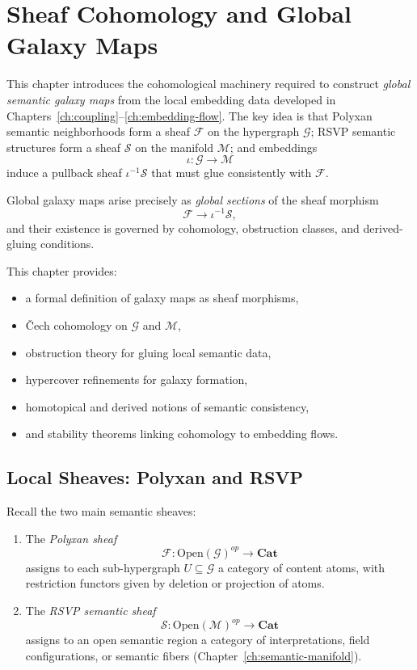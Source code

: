 \chapter{Sheaf Cohomology and Global Galaxy Maps}
\label{ch:global-galaxy-maps}

This chapter introduces the cohomological machinery required to construct
\emph{global semantic galaxy maps} from the local embedding data developed in
Chapters~\ref{ch:coupling}--\ref{ch:embedding-flow}.
The key idea is that Polyxan semantic neighborhoods form a sheaf
$\mathcal{F}$ on the hypergraph $\mathcal{G}$; 
RSVP semantic structures form a sheaf $\mathscr{S}$ on the manifold 
$\mathcal{M}$; and embeddings
\[
  \iota : \mathcal{G} \to \mathcal{M}
\]
induce a pullback sheaf 
\(
  \iota^{-1}\mathscr{S}
\)
that must glue consistently with $\mathcal{F}$.

Global galaxy maps arise precisely as \emph{global sections}
of the sheaf morphism
\[
  \mathcal{F} \longrightarrow \iota^{-1}\mathscr{S},
\]
and their existence is governed by cohomology, 
obstruction classes, and derived-gluing conditions.

This chapter provides:

\begin{itemize}
  \item a formal definition of galaxy maps as sheaf morphisms,
  \item Čech cohomology on $\mathcal{G}$ and $\mathcal{M}$,
  \item obstruction theory for gluing local semantic data,
  \item hypercover refinements for galaxy formation,
  \item homotopical and derived notions of semantic consistency,
  \item and stability theorems linking cohomology to embedding flows.
\end{itemize}

\section{Local Sheaves: Polyxan and RSVP}

Recall the two main semantic sheaves:

\begin{enumerate}
  \item The \emph{Polyxan sheaf} 
  \[
    \mathcal{F}: \mathrm{Open}(\mathcal{G})^{op} \to \mathbf{Cat}
  \]
  assigns to each sub-hypergraph $U\subseteq\mathcal{G}$ 
  a category of content atoms,
  with restriction functors given by deletion or projection of atoms.

  \item The \emph{RSVP semantic sheaf}
  \[
    \mathscr{S}: \mathrm{Open}(\mathcal{M})^{op} \to \mathbf{Cat}
  \]
  assigns to an open semantic region 
  a category of interpretations, field configurations,
  or semantic fibers (Chapter~\ref{ch:semantic-manifold}).
\end{enumerate}

